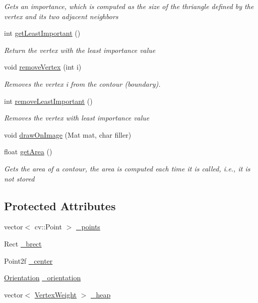 \begin{DoxyCompactItemize}
\begin{DoxyCompactList}\small\item\em Gets an importance, which is computed as the size of the thriangle defined by the vertex and its two adjacent neighbors \end{DoxyCompactList}\item 
int \hyperlink{class_contour_a89afece7e3b513654cee39410ed57e86}{get\+Least\+Important} ()
\begin{DoxyCompactList}\small\item\em Return the vertex with the least importance value \end{DoxyCompactList}\item 
void \hyperlink{class_contour_a1d45bb2a1ca97b4fa9418f9c43318f2a}{remove\+Vertex} (int i)
\begin{DoxyCompactList}\small\item\em Removes the vertex i from the contour (boundary). \end{DoxyCompactList}\item 
int \hyperlink{class_contour_a3f30ccff7776c7aacae37145df5da467}{remove\+Least\+Important} ()
\begin{DoxyCompactList}\small\item\em Removes the vertex with least importance value \end{DoxyCompactList}\item 
void \hyperlink{class_contour_ac36273da0f11bf3095087f26ca3c6440}{draw\+On\+Image} (Mat mat, char filler)
\item 
float \hyperlink{class_contour_a6c162802a4123888526f43561e7584f5}{get\+Area} ()
\begin{DoxyCompactList}\small\item\em Gets the area of a contour, the area is computed each time it is called, i.\+e., it is not stored \end{DoxyCompactList}\end{DoxyCompactItemize}
\subsection*{Protected Attributes}
\begin{DoxyCompactItemize}
\item 
vector$<$ cv\+::\+Point $>$ \hyperlink{class_contour_a5fe5723655cd3e3a1e40a433565ed9f7}{\+\_\+points}
\item 
Rect \hyperlink{class_contour_aefe73b0c7479e0a6bca7c76e5cc4aa6d}{\+\_\+brect}
\item 
Point2f \hyperlink{class_contour_a60351d0013e44e0ea12b8c2f227b2d74}{\+\_\+center}
\item 
\hyperlink{_contour_8h_a25057779f97dd06805ea5fcf36635c40}{Orientation} \hyperlink{class_contour_a946768dfb1a6b340165360db2bf279db}{\+\_\+orientation}
\item 
vector$<$ \hyperlink{_contour_8h_a8f46426628d6edd9ed397144417e79ee}{Vertex\+Weight} $>$ \hyperlink{class_contour_a7a26f7919fa25f04975ab3949152437b}{\+\_\+heap}
\end{DoxyCompactItemize}



